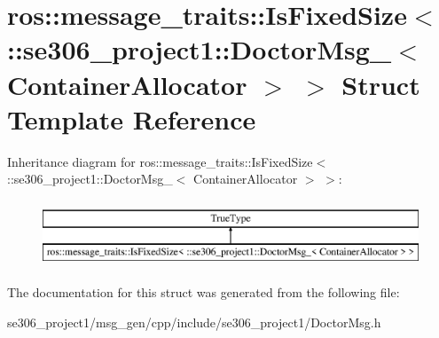 \hypertarget{structros_1_1message__traits_1_1IsFixedSize_3_01_1_1se306__project1_1_1DoctorMsg___3_01ContainerAllocator_01_4_01_4}{\section{ros\-:\-:message\-\_\-traits\-:\-:Is\-Fixed\-Size$<$ \-:\-:se306\-\_\-project1\-:\-:Doctor\-Msg\-\_\-$<$ Container\-Allocator $>$ $>$ Struct Template Reference}
\label{structros_1_1message__traits_1_1IsFixedSize_3_01_1_1se306__project1_1_1DoctorMsg___3_01ContainerAllocator_01_4_01_4}
}
Inheritance diagram for ros\-:\-:message\-\_\-traits\-:\-:Is\-Fixed\-Size$<$ \-:\-:se306\-\_\-project1\-:\-:Doctor\-Msg\-\_\-$<$ Container\-Allocator $>$ $>$\-:\begin{figure}[H]
\begin{center}
\leavevmode
\includegraphics[height=2.000000cm]{structros_1_1message__traits_1_1IsFixedSize_3_01_1_1se306__project1_1_1DoctorMsg___3_01ContainerAllocator_01_4_01_4}
\end{center}
\end{figure}


The documentation for this struct was generated from the following file\-:\begin{DoxyCompactItemize}
\item 
se306\-\_\-project1/msg\-\_\-gen/cpp/include/se306\-\_\-project1/Doctor\-Msg.\-h\end{DoxyCompactItemize}
